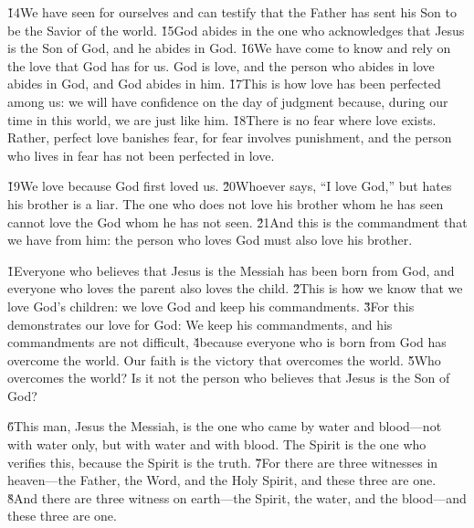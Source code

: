 \v{14}We have seen for ourselves and can testify that the Father has sent his Son to be the Savior of the world. \v{15}God abides in the one who acknowledges that Jesus is the Son of God, and he abides in God. \v{16}We have come to know and rely on the love that God has for us. God is love, and the person who abides in love abides in God, and God abides in him. \v{17}This is how love has been perfected among us: we will have confidence on the day of judgment because, during our time in this world, we are just like him. \v{18}There is no fear where love exists. Rather, perfect love banishes fear, for fear involves punishment, and the person who lives in fear has not been perfected in love.

\v{19}We love because God first loved us. \v{20}Whoever says, ``I love God,'' but hates his brother is a liar. The one who does not love his brother whom he has seen cannot love the God whom he has not seen. \v{21}And this is the commandment that we have from him: the person who loves God must also love his brother.

\v{1}Everyone who believes that Jesus is the Messiah has been born from God, and everyone who loves the parent also loves the child. \v{2}This is how we know that we love God's children: we love God and keep his commandments. \v{3}For this demonstrates our love for God: We keep his commandments, and his commandments are not difficult, \v{4}because everyone who is born from God has overcome the world. Our faith is the victory that overcomes the world. \v{5}Who overcomes the world? Is it not the person who believes that Jesus is the Son of God?

\v{6}This man, Jesus the Messiah, is the one who came by water and blood---not with water only, but with water and with blood. The Spirit is the one who verifies this, because the Spirit is the truth. \v{7}For there are three witnesses in heaven---the Father, the Word, and the Holy Spirit, and these three are one. \v{8}And there are three witness on earth---the Spirit, the water, and the blood---and these three are one.

